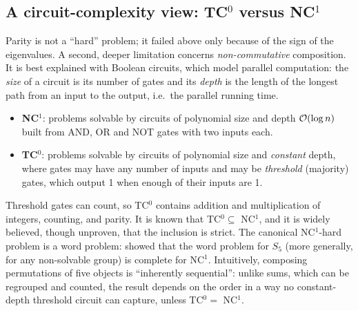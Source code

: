 \subsection{A circuit-complexity view: TC\texorpdfstring{$^0$}{0} versus NC\texorpdfstring{$^1$}{1}}\label{sec:c06-complexity}

Parity is not a ``hard'' problem; it failed above only because of the sign of the
eigenvalues. A second, deeper limitation concerns \emph{non-commutative} composition. It is
best explained with Boolean circuits, which model parallel computation: the \emph{size} of
a circuit is its number of gates and its \emph{depth} is the length of the longest path
from an input to the output, i.e.\ the parallel running time.
\begin{itemize}
\item \textbf{NC$^1$}: problems solvable by circuits of polynomial size and depth
$\mathcal{O}(\log n)$ built from AND, OR and NOT gates with two inputs each.
\item \textbf{TC$^0$}: problems solvable by circuits of polynomial size and \emph{constant}
depth, where gates may have any number of inputs and may be \emph{threshold} (majority)
gates, which output 1 when enough of their inputs are 1.
\end{itemize}
Threshold gates can count, so TC$^0$ contains addition and multiplication of integers,
counting, and parity. It is known that TC$^0\subseteq$ NC$^1$, and it is widely believed,
though unproven, that the inclusion is strict. The canonical NC$^1$-hard problem is a word
problem: \citet{c06-barrington1989} showed that the word problem for $S_5$ (more generally,
for any non-solvable group) is complete for NC$^1$. Intuitively, composing permutations of
five objects is ``inherently sequential'': unlike sums, which can be regrouped and counted,
the result depends on the order in a way no constant-depth threshold circuit can capture,
unless TC$^0=$ NC$^1$.

